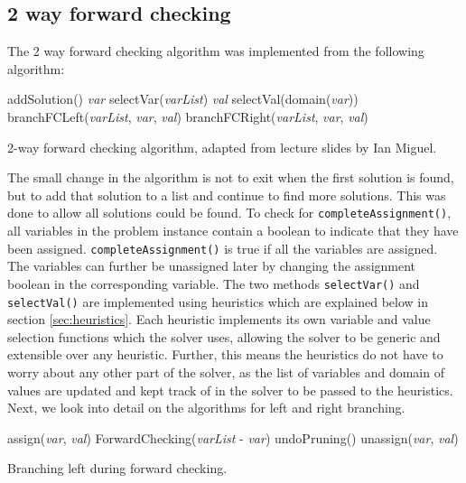 \documentclass{article}
\begin{document}
\subsection{2 way forward checking}
The 2 way forward checking algorithm was implemented from the following algorithm:
\begin{algorithm}[H]
\begin{algorithmic}[1]
	\State addSolution()
	\Return
\Else
	\State \textit{var} \gets selectVar(\textit{varList})
	\State \textit{val} \gets selectVal(domain(\textit{var}))
	\State branchFCLeft(\textit{varList}, \textit{var}, \textit{val})
	\State branchFCRight(\textit{varList}, \textit{var}, \textit{val})
\EndIf
\EndProcedure
\end{algorithmic}
\caption{2-way forward checking algorithm, adapted from lecture slides by Ian Miguel.}
\end{algorithm}
The small change in the algorithm is not to exit when the first solution is found, but to add that solution to a list and continue to find more solutions. This was done to allow all solutions could be found. 
To check for \texttt{completeAssignment()}, all variables in the problem instance contain a boolean to indicate that they have been assigned. \texttt{completeAssignment()} is true if all the variables are assigned. The variables can further be unassigned later by changing the assignment boolean in the corresponding variable.  
\n
The two methods \texttt{selectVar()} and \texttt{selectVal()} are implemented using heuristics which are explained below in section \ref{sec:heuristics}. Each heuristic implements its own variable and value selection functions which the solver uses, allowing the solver to be generic and extensible over any heuristic. Further, this means the heuristics do not have to worry about any other part of the solver, as the list of variables and domain of values are updated and kept track of in the solver to be passed to the heuristics. 
\n
Next, we look into detail on the algorithms for left and right branching.
\begin{algorithm}[H]
\begin{algorithmic}[1]
\State assign(\textit{var}, \textit{val})
	\State ForwardChecking(\textit{varList} - \textit{var})
\EndIf
\State undoPruning()
\State unassign(\textit{var}, \textit{val})
\EndProcedure
\end{algorithmic}
\caption{Branching left during forward checking.}
\end{algorithm}
\end{document}
